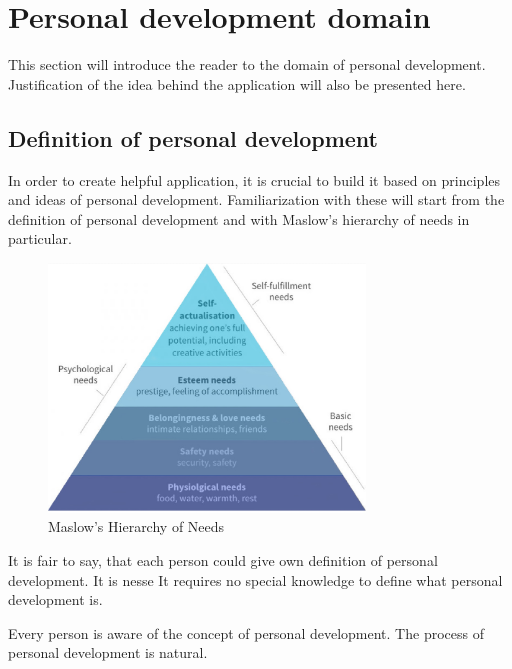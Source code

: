 
\chapter{Personal development domain}\label{ch:personal-development-domain}


This section will introduce the reader to the domain of personal development.
Justification of the idea behind the application will also be presented here.

\section{Definition of personal development}\label{sec:definition-of-personal-development}

In order to create helpful application, it is crucial to build it based on principles and ideas of personal development.
Familiarization with these will start from the definition of personal development and with Maslow's hierarchy of needs in particular.

\begin{figure}[h]
    \includegraphics[width=0.75\textwidth]{images/maslows.jpg}
    \caption{Maslow's Hierarchy of Needs~\cite{maslows}}
    \label{fig:maslows}
\end{figure}




It is fair to say, that each person could give own definition of personal development.
It is nesse
It requires no special knowledge to define what personal development is.

Every person is aware of the concept of personal development.
The process of personal development is natural.
